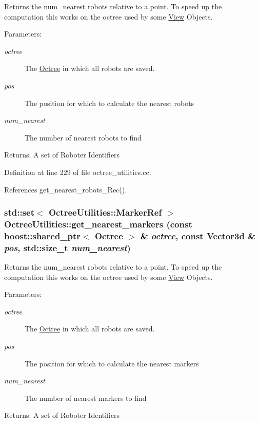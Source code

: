 Returns the num\_\-nearest robots relative to a point. To speed up the computation this works on the octree used by some \hyperlink{class_view}{View} Objects.

\begin{Desc}
\item[Parameters:]
\begin{description}
\item[{\em octree}]The \hyperlink{class_octree}{Octree} in which all robots are saved. \item[{\em pos}]The position for which to calculate the nearest robots \item[{\em num\_\-nearest}]The number of nearest robots to find\end{description}
\end{Desc}
\begin{Desc}
\item[Returns:]A set of Roboter Identifiers \end{Desc}


Definition at line 229 of file octree\_\-utilities.cc.

References get\_\-nearest\_\-robots\_\-Rec().\hypertarget{class_octree_utilities_881aca84cc863219aa0b96123b70f0ca}{
\subsubsection[get\_\-nearest\_\-markers]{\setlength{\rightskip}{0pt plus 5cm}std::set$<$ OctreeUtilities::MarkerRef $>$ OctreeUtilities::get\_\-nearest\_\-markers (const boost::shared\_\-ptr$<$ {\bf Octree} $>$ \& {\em octree}, \/  const Vector3d \& {\em pos}, \/  std::size\_\-t {\em num\_\-nearest})}}
\label{class_octree_utilities_881aca84cc863219aa0b96123b70f0ca}


Returns the num\_\-nearest robots relative to a point. To speed up the computation this works on the octree used by some \hyperlink{class_view}{View} Objects.

\begin{Desc}
\item[Parameters:]
\begin{description}
\item[{\em octree}]The \hyperlink{class_octree}{Octree} in which all robots are saved. \item[{\em pos}]The position for which to calculate the nearest markers \item[{\em num\_\-nearest}]The number of nearest markers to find\end{description}
\end{Desc}
\begin{Desc}
\item[Returns:]A set of Roboter Identifiers \end{Desc}



